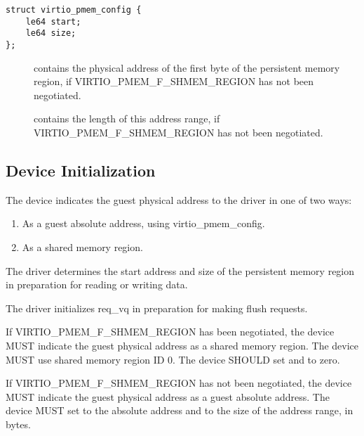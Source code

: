 \begin{lstlisting}
struct virtio_pmem_config {
	le64 start;
	le64 size;
};
\end{lstlisting}

\begin{description}
\item[] contains the physical address of the first byte of the
persistent memory region, if VIRTIO_PMEM_F_SHMEM_REGION has not been negotiated.

\item[] contains the length of this address range, if
VIRTIO_PMEM_F_SHMEM_REGION has not been negotiated.
\end{description}

\subsection{Device Initialization}\label{sec:Device Types / PMEM Device / Device Initialization}

The device indicates the guest physical address to the driver in one of two ways:
\begin{enumerate}
\item As a guest absolute address, using virtio_pmem_config.
\item As a shared memory region.
\end{enumerate}

The driver determines the start address and size of the persistent memory region in preparation for reading or writing data.

The driver initializes req_vq in preparation for making flush requests.


If VIRTIO_PMEM_F_SHMEM_REGION has been negotiated, the device MUST indicate the
guest physical address as a shared memory region. The device MUST use shared
memory region ID 0. The device SHOULD set  and  to zero.

If VIRTIO_PMEM_F_SHMEM_REGION has not been negotiated, the device MUST indicate
the guest physical address as a guest absolute address. The device MUST set
 to the absolute address and  to the size of the
address range, in bytes.

